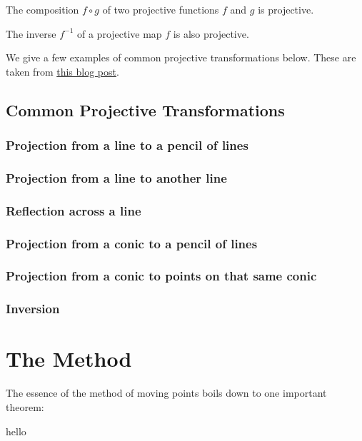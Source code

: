 \documentclass{article}
\theoremstyle{mytheoremstyle}
\theoremstyle{mytheoremstyle}
\theoremstyle{myproblemstyle}
\begin{document}
    \begin{theorem}
        The composition $f \circ g$ of two projective functions $f$ and $g$ is projective.
    \end{theorem}

    \begin{theorem}
        The inverse $f^{-1}$ of a projective map $f$ is also projective.
    \end{theorem}

    

    We give a few examples of common projective transformations below. These are taken from \href{https://artofproblemsolving.com/community/c473124h1763266_moving_points_tutorial}{this blog post}.


    \subsection{Common Projective Transformations}
    \subsubsection{Projection from a line to a pencil of lines}
    \subsubsection{Projection from a line to another line}
    \subsubsection{Reflection across a line}
    \subsubsection{Projection from a conic to a pencil of lines}
    \subsubsection{Projection from a conic to points on that same conic}
    \subsubsection{Inversion}

    \section{The Method}
    The essence of the method of moving points boils down to one important theorem:
    \begin{theorem}
        hello
    \end{theorem}
\end{document}
